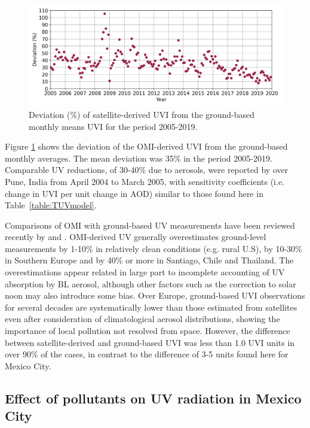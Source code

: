 \documentclass[journal=jacsat,manuscript=article]{achemso}
\begin{document}
\begin{figure}[H]
  \centering
  \includegraphics[width=0.95\columnwidth]{figures/Monthly_mean_RD.png}
  \caption{Deviation (\%) of satellite-derived UVI from the ground-based monthly means UVI for the period 2005-2019.}
  \label{fig:percentage_relative_difference}
\end{figure}

Figure \ref{fig:percentage_relative_difference} shows the deviation of the OMI-derived UVI from the ground-based monthly averages. The mean deviation
was 35\% in the period 2005-2019. Comparable UV reductions, of 30-40\% due to aerosols, were reported by
\citet{Panicker_2009} over Pune, India from April 2004 to
March 2005, with sensitivity coefficients (i.e. change in UVI per unit
change in AOD) similar to those found here in Table~\ref{table:TUVmodel}.

Comparisons of OMI with ground-based UV measurements have been reviewed
recently by \citet{Zhang_2019} and \citet{Vitt_2020}.
OMI-derived UV generally overestimates
ground-level measurements by 1-10\% in relatively clean conditions (e.g.
rural U.S), by 10-30\% in Southern Europe and by 40\% or more in
Santiago, Chile\citep{Cabrera_2012} and Thailand\citep{Janjai_2013}. The
overestimations appear related in large part to incomplete accounting of
UV absorption by BL aerosol, although other factors such as the
correction to solar noon may also introduce some
bias.\citep{Zhang_2019} Over Europe, ground-based UVI observations for
several decades are systematically lower than those estimated from
satellites even after consideration of climatological aerosol
distributions, showing the importance of local pollution not resolved
from space.\citep{Vitt_2020} However, the difference between
satellite-derived and ground-based UVI was less than 1.0 UVI units in
over 90\% of the cases, in contrast to the difference of 3-5 units found
here for Mexico City.

\subsection{Effect of pollutants on UV radiation in Mexico City}
\end{document}
